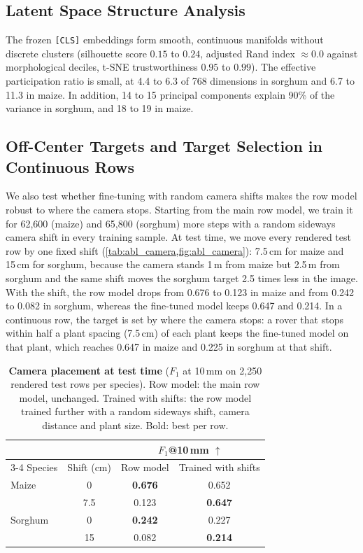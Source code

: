 \documentclass[10pt,twocolumn,letterpaper]{article}
\begin{document}
\subsection{Latent Space Structure Analysis}
The frozen \texttt{[CLS]} embeddings form smooth, continuous manifolds without discrete clusters (silhouette score $0.15$ to $0.24$, adjusted Rand index $\approx 0.0$ against morphological deciles, t-SNE trustworthiness $0.95$ to $0.99$). The effective participation ratio is small, at 4.4 to 6.3 of 768 dimensions in sorghum and 6.7 to 11.3 in maize. In addition, 14 to 15 principal components explain 90\% of the variance in sorghum, and 18 to 19 in maize.


\subsection{Off-Center Targets and Target Selection in Continuous Rows}
\label{sec:abl_camera}


We also test whether fine-tuning with random camera shifts makes the row model robust to where the camera stops.
Starting from the main row model, we train it for 62{,}600 (maize) and 65{,}800 (sorghum) more steps with a random
sideways camera shift in every training sample. At test time, we move every rendered test row by one fixed shift (\cref{tab:abl_camera,fig:abl_camera}): 7.5\,cm for maize and
15\,cm for sorghum, because the camera stands 1\,m from maize but 2.5\,m from sorghum and the same shift moves the
sorghum target 2.5 times less in the image. With the shift, the row model drops from 0.676 to 0.123 in maize and from
0.242 to 0.082 in sorghum, whereas the fine-tuned model keeps 0.647 and 0.214. In a continuous row, the target is set
by where the camera stops: a rover that stops within half a plant spacing (7.5\,cm) of each plant keeps the fine-tuned
model on that plant, which reaches 0.647 in maize and 0.225 in sorghum at that shift.

\begin{table}[t]
  \caption{\textbf{Camera placement at test time} ($F_1$ at 10\,mm on 2{,}250 rendered test rows per species). Row
  model: the main row model, unchanged. Trained with shifts: the row model trained further with a random sideways
  shift, camera distance and plant size. Bold: best per row.}
  \label{tab:abl_camera}
  \centering\small
  \setlength{\tabcolsep}{4pt}
  \begin{tabular}{@{}l c cc@{}}
    \toprule
    & & \multicolumn{2}{c}{$F_1$@10\,mm $\uparrow$} \\
    \cmidrule(l){3-4}
    Species & Shift (cm) & Row model & Trained with shifts \\
    \midrule
    Maize & 0 & \textbf{0.676} & 0.652 \\
     & 7.5 & 0.123 & \textbf{0.647} \\
    \midrule
    Sorghum & 0 & \textbf{0.242} & 0.227 \\
     & 15 & 0.082 & \textbf{0.214} \\
    \bottomrule
  \end{tabular}
\end{table}
\end{document}
